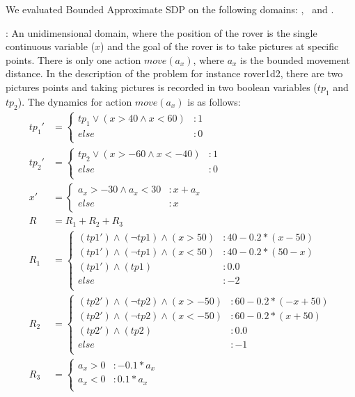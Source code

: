 \label{sec:empirical}

We evaluated Bounded Approximate SDP on the following domains:
\MarsRoverUni, \MarsRoverBi ~and \Invent.

\MarsRoverUni:
An unidimensional domain, where the position of the rover is the single continuous variable ($x$) and the goal of the rover is to take pictures at specific points. There is only one action $ move(a_x)$, where $a_x$ is the bounded movement distance. In the description of the problem for instance rover1d2, there are two pictures points and taking pictures is recorded in two boolean variables ($tp_1$ and $tp_2$). The dynamics for action $move(a_x)$ is as follows:
{\footnotesize
\begin{align*}
tp_1' &= \begin{cases}
tp_1 \vee (x>40 \wedge x<60)&: 1\\
else&: 0\\
\end{cases}\\
tp_2' &= \begin{cases}
tp_2 \vee (x>-60 \wedge x<-40)&: 1\\
else&: 0\\
\end{cases}\\
x' &= \begin{cases}
a_x>-30 \wedge a_x<30&: x +a_x\\
else&: x\\
\end{cases}\\
R & = R_1 + R_2 + R_3\\
R_1 & = \begin{cases} 
(tp1') \wedge (\neg tp1) \wedge (x > 50) &: 40 - 0.2*(x -50)\\
(tp1') \wedge (\neg tp1) \wedge (x < 50) &: 40 - 0.2*(50-x)\\
(tp1') \wedge ( tp1) &:  0.0\\
else &: -2\\
\end{cases} \\
R_2 & = \begin{cases} 
(tp2') \wedge (\neg tp2) \wedge (x > -50) &: 60 - 0.2*(-x +50)\\
(tp2') \wedge (\neg tp2) \wedge (x < -50) &: 60 - 0.2*(x +50)\\
(tp2') \wedge ( tp2) &:  0.0\\
else &: -1\\
\end{cases} \\
R_3 & = \begin{cases} 
a_x > 0 &: -0.1*a_x\\
a_x < 0 &: 0.1*a_x\\
\end{cases} \\
\end{align*} }

